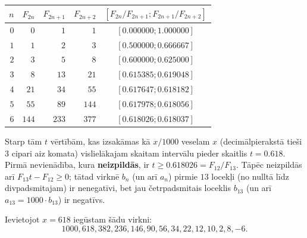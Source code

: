 \documentclass[a4paper,12pt]{article}
\begin{document}
\begin{problem}
{\begin{tabular}{|r||r|r|r|c|} \hline
$n$ & $F_{2n}$ & $F_{2n+1}$ & $F_{2n+2}$ & $[ F_{2n}/F_{2n+1}; F_{2n+1}/F_{2n+2}]$ \\ \hline
$0$ & $0$ & $1$ & $1$ & $[0.000000;1.000000]$ \\ \hline
$1$ & $1$ & $2$ & $3$ & $[0.500000;0.666667]$ \\ \hline
$2$ & $3$ & $5$ & $8$ & $[0.600000;0.625000]$ \\ \hline
$3$ & $8$ & $13$ & $21$ & $[0.615385;0.619048]$ \\ \hline
$4$ & $21$ & $34$ & $55$ & $[0.617647;0.618182]$ \\ \hline
$5$ & $55$ & $89$ & $144$ & $[0.617978;0.618056]$ \\ \hline
$6$ & $144$ & $233$ & $377$ & $[0.618026;0.618037]$ \\ \hline
\end{tabular}

Starp tām $t$ vērtībām, kas izsakāmas kā $x/1000$ veselam $x$ (decimālpierakstā tieši $3$ cipari aiz komata)
vislielākajam skaitam intervālu pieder skaitlis $t = 0.618$. Pirmā nevienādība, kura {\bf neizpildās}, 
ir $t \geq 0.618026 = F_{12}/F_{13}$. Tāpēc neizpildās arī $F_{13}t - F_{12} \geq 0$; tātad virknē $b_n$ (un arī $a_n$) 
pirmie $13$ locekļi (no nulltā līdz divpadsmitajam) ir nenegatīvi, bet jau četrpadsmitais loceklis $b_{13}$ (un arī $a_{13} = 1000 \cdot b_{13}$) 
ir negatīvs. 

Ievietojot $x = 618$ iegūstam šādu virkni: 
\[ 1000, 618, 382, 236, 146, 90, 56, 34, 22, 12, 10, 2, 8, -6. \]
}
\end{problem}
\end{document}
